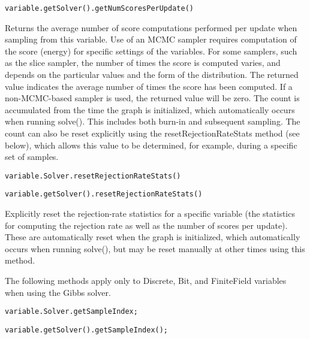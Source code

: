 \ifjava
\begin{lstlisting}
variable.getSolver().getNumScoresPerUpdate()
\end{lstlisting}
\fi

Returns the average number of score computations performed per update when sampling from this variable.  Use of an MCMC sampler requires computation of the score (energy) for specific settings of the variables.  For some samplers, such as the slice sampler, the number of times the score is computed varies, and depends on the particular values and the form of the distribution.  The returned value indicates the average number of times the score has been computed.  If a non-MCMC-based sampler is used, the returned value will be zero.  The count is accumulated from the time the graph is initialized, which automatically occurs when running solve().  This includes both burn-in and subsequent sampling.  The count can also be reset explicitly using the resetRejectionRateStats method (see below), which allows this value to be determined, for example, during a specific set of samples.

\ifmatlab
\begin{lstlisting}
variable.Solver.resetRejectionRateStats()
\end{lstlisting}
\fi

\ifjava
\begin{lstlisting}
variable.getSolver().resetRejectionRateStats()
\end{lstlisting}
\fi

Explicitly reset the rejection-rate statistics for a specific variable (the statistics for computing the rejection rate as well as the number of scores per update).  These are automatically reset when the graph is initialized, which automatically occurs when running solve(), but may be reset manually at other times using this method.




The following methods apply only to Discrete, Bit, and FiniteField variables when using the Gibbs solver.

\ifmatlab
\begin{lstlisting}
variable.Solver.getSampleIndex;
\end{lstlisting}
\fi

\ifjava
\begin{lstlisting}
variable.getSolver().getSampleIndex();
\end{lstlisting}
\fi

